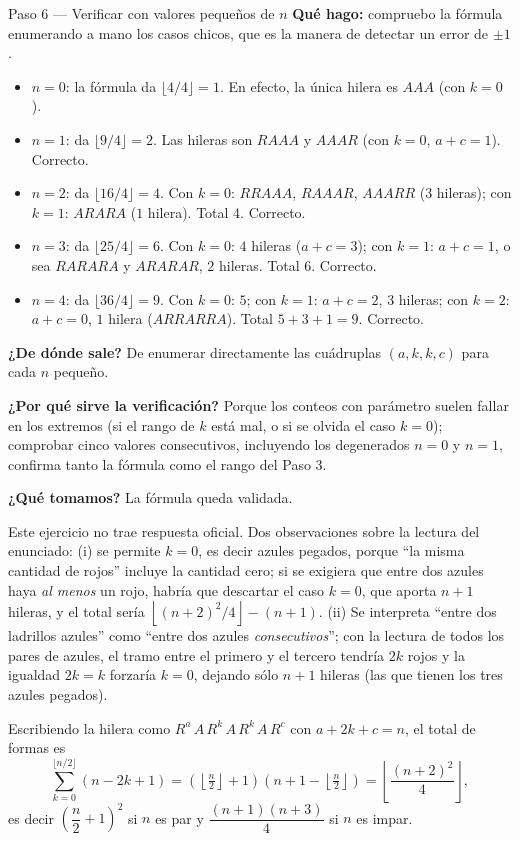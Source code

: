 \documentclass[11pt]{article}
\begin{document}
\begin{paso}{Paso 6 --- Verificar con valores pequeños de $n$}
\textbf{Qué hago:} compruebo la fórmula enumerando a mano los casos chicos, que es la manera de detectar un error de $\pm 1$.

\begin{itemize}[leftmargin=1.3em,itemsep=2pt]
\item $n=0$: la fórmula da $\lfloor 4/4\rfloor = 1$. En efecto, la única hilera es $AAA$ (con $k=0$).
\item $n=1$: da $\lfloor 9/4\rfloor = 2$. Las hileras son $RAAA$ y $AAAR$ (con $k=0$, $a+c=1$). Correcto.
\item $n=2$: da $\lfloor 16/4\rfloor = 4$. Con $k=0$: $RRAAA$, $RAAAR$, $AAARR$ ($3$ hileras); con $k=1$: $ARARA$ ($1$ hilera). Total $4$. Correcto.
\item $n=3$: da $\lfloor 25/4\rfloor = 6$. Con $k=0$: $4$ hileras ($a+c=3$); con $k=1$: $a+c=1$, o sea $RARARA$ y $ARARAR$, $2$ hileras. Total $6$. Correcto.
\item $n=4$: da $\lfloor 36/4\rfloor = 9$. Con $k=0$: $5$; con $k=1$: $a+c=2$, $3$ hileras; con $k=2$: $a+c=0$, $1$ hilera ($ARRARRA$). Total $5+3+1 = 9$. Correcto.
\end{itemize}

\textbf{¿De dónde sale?} De enumerar directamente las cuádruplas $(a,k,k,c)$ para cada $n$ pequeño.

\textbf{¿Por qué sirve la verificación?} Porque los conteos con parámetro suelen fallar en los extremos (si el rango de $k$ está mal, o si se olvida el caso $k=0$); comprobar cinco valores consecutivos, incluyendo los degenerados $n=0$ y $n=1$, confirma tanto la fórmula como el rango del Paso 3.

\textbf{¿Qué tomamos?} La fórmula queda validada.
\end{paso}

\begin{nota}
Este ejercicio no trae respuesta oficial. Dos observaciones sobre la lectura del enunciado: (i) se permite $k=0$, es decir azules pegados, porque ``la misma cantidad de rojos'' incluye la cantidad cero; si se exigiera que entre dos azules haya \emph{al menos} un rojo, habría que descartar el caso $k=0$, que aporta $n+1$ hileras, y el total sería $\left\lfloor (n+2)^2/4\right\rfloor - (n+1)$. (ii) Se interpreta ``entre dos ladrillos azules'' como ``entre dos azules \emph{consecutivos}''; con la lectura de todos los pares de azules, el tramo entre el primero y el tercero tendría $2k$ rojos y la igualdad $2k=k$ forzaría $k=0$, dejando sólo $n+1$ hileras (las que tienen los tres azules pegados).
\end{nota}

\begin{resp}
Escribiendo la hilera como $R^{a}\,A\,R^{k}\,A\,R^{k}\,A\,R^{c}$ con $a+2k+c=n$, el total de formas es
\[
\sum_{k=0}^{\lfloor n/2\rfloor}(n-2k+1) = \left(\left\lfloor \tfrac{n}{2}\right\rfloor+1\right)\left(n+1-\left\lfloor \tfrac{n}{2}\right\rfloor\right)
= \left\lfloor \frac{(n+2)^{2}}{4} \right\rfloor ,
\]
es decir $\left(\dfrac{n}{2}+1\right)^{2}$ si $n$ es par y $\dfrac{(n+1)(n+3)}{4}$ si $n$ es impar.
\end{resp}
\end{document}
